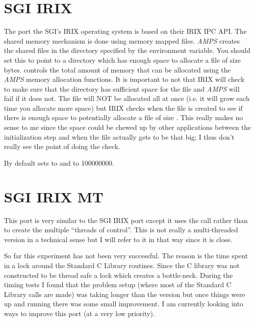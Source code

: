 \section{SGI IRIX}
\label{SGI IRIX}

The port the SGI's IRIX operating system is based on their IRIX IPC
API.  The shared memory mechanism is done using memory mapped files.
{\em AMPS} creates the shared files in the directory specified by the
 environment variable.  You should set this to
point to a directory which has enough space to allocate a file of size
 bytes.   controls the
total amount of memory that can be allocated using the {\em AMPS}
memory allocation functions.  It is important to not that IRIX will
check to make sure that the directory has sufficient space for the
file and {\em AMPS} will fail if it does not.  The file will NOT be
allocated all at once (i.e. it will grow each time you allocate more
space) but IRIX checks when the file is created to see if there is
enough space to potentially allocate a file of size
.  This really makes no sense to me since the
space could be chewed up by other applications between the
initialization step and when the file actually gets to be that big; I
thus don't really see the point of doing the check.

By default \parflow{} sets  to  and
 to 100000000.



\section{SGI IRIX MT}
\label{SGI IRIX MT}

This port is very similar to the SGI IRIX port except it uses
the  call rather than  to create the multiple
``threads of control''.  This is not really a multi-threaded version
in a technical sense but I will refer to it in that way since it is
close.  

So far this experiment has not been very successful.  The reason is the
time spent in a lock around the Standard C Library routines.  Since
the C library was not constructed to be thread safe a lock which
creates a bottle-neck.  During the timing tests I found that the
problem setup (where most of the Standard C Library calls are made)
was taking longer than the  version but once things were up
and running there was some small improvement.  I am currently looking
into ways to improve this port (at a very low priority).

